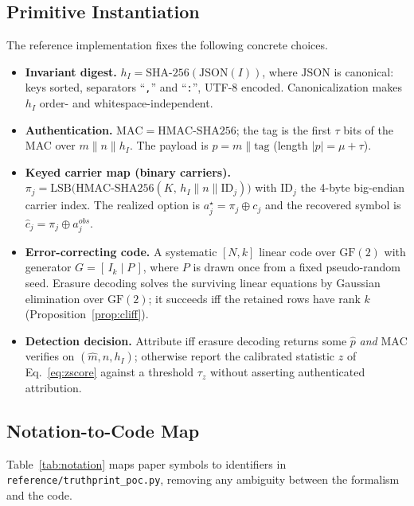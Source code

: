 \documentclass[11pt]{article}
\begin{document}
\subsection{Primitive Instantiation}
The reference implementation fixes the following concrete choices.
\begin{itemize}[leftmargin=*]
  \item \textbf{Invariant digest.} $h_I=\mathrm{SHA\text{-}256}(\mathrm{JSON}(I))$, where $\mathrm{JSON}$ is canonical: keys sorted, separators ``\texttt{,}'' and ``\texttt{:}'', UTF-8 encoded. Canonicalization makes $h_I$ order- and whitespace-independent.
  \item \textbf{Authentication.} $\mathrm{MAC}=\mathrm{HMAC\text{-}SHA256}$; the tag is the first $\tau$ bits of the MAC over $m\parallel n\parallel h_I$. The payload is $p=m\parallel\mathrm{tag}$ (length $|p|=\mu+\tau$).
  \item \textbf{Keyed carrier map (binary carriers).} $\pi_j=\mathrm{LSB}\big(\mathrm{HMAC\text{-}SHA256}(K,\,h_I\parallel n\parallel \mathrm{ID}_j)\big)$ with $\mathrm{ID}_j$ the 4-byte big-endian carrier index. The realized option is $a_j^\star=\pi_j\oplus c_j$ and the recovered symbol is $\hat c_j=\pi_j\oplus a_j^{obs}$.
  \item \textbf{Error-correcting code.} A systematic $[N,k]$ linear code over $\mathrm{GF}(2)$ with generator $G=[\,I_k\mid P\,]$, where $P$ is drawn once from a fixed pseudo-random seed. Erasure decoding solves the surviving linear equations by Gaussian elimination over $\mathrm{GF}(2)$; it succeeds iff the retained rows have rank $k$ (Proposition~\ref{prop:cliff}).
  \item \textbf{Detection decision.} Attribute iff erasure decoding returns some $\hat p$ \emph{and} $\mathrm{MAC}$ verifies on $(\hat m,n,h_I)$; otherwise report the calibrated statistic $z$ of Eq.~\eqref{eq:zscore} against a threshold $\tau_z$ without asserting authenticated attribution.
\end{itemize}

\subsection{Notation-to-Code Map}
Table~\ref{tab:notation} maps paper symbols to identifiers in \texttt{reference/truthprint\_poc.py}, removing any ambiguity between the formalism and the code.
\end{document}
